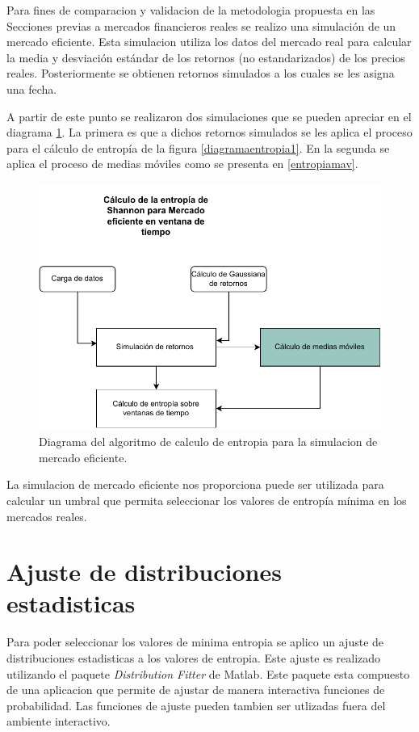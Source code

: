 Para fines de comparacion y validacion de la metodologia propuesta en las Secciones previas a mercados financieros reales se realizo una simulación de un mercado eficiente.
Esta simulacion utiliza los datos del mercado real para calcular la media y desviación estándar  de los retornos (no estandarizados) de los precios reales. 
Posteriormente se obtienen retornos simulados a los cuales se les asigna una fecha.

A partir de este punto se realizaron dos simulaciones que se pueden apreciar en el diagrama \ref{simulacion}.
La primera es que a dichos retornos simulados se les aplica el proceso para el cálculo de entropía de la figura \ref{diagramaentropia1}.
En la segunda se aplica el proceso de medias móviles como se presenta en \ref{entropiamav}.

\begin{figure}
	\centering
	\includegraphics[width=0.9\linewidth]{figures/simulacion}
	\caption{Diagrama del algoritmo de calculo de entropia para la simulacion de mercado eficiente. }
	\label{simulacion}
\end{figure}

La simulacion de mercado eficiente nos proporciona puede ser utilizada para calcular un umbral que permita seleccionar los valores de entropía mínima en los mercados reales. 
 
\section{Ajuste de distribuciones estadisticas}
\label{ajuste}
Para poder seleccionar los valores de minima entropia se aplico un ajuste de distribuciones estadisticas a los valores de entropia.
Este ajuste es realizado utilizando el paquete \textit{Distribution Fitter} de Matlab.
Este paquete esta compuesto de una aplicacion que permite de ajustar de manera interactiva funciones de probabilidad.
Las funciones de ajuste pueden tambien ser utlizadas fuera del ambiente interactivo.

